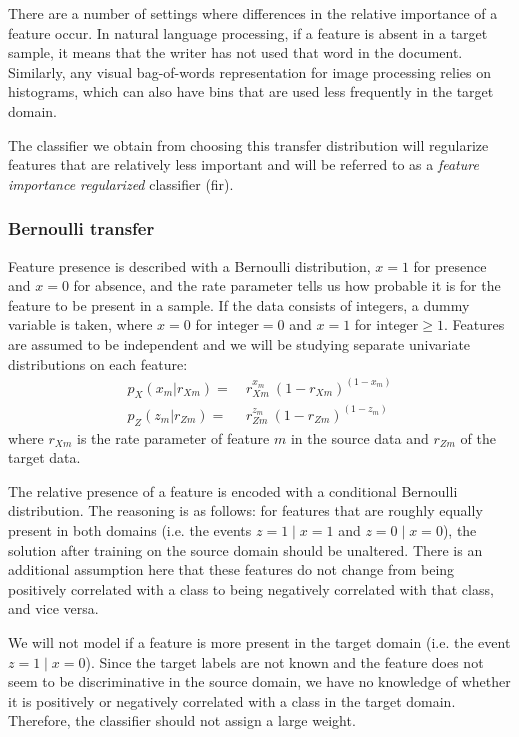 \documentclass[twoside,11pt]{article}
\begin{document}
There are a number of settings where differences in the relative importance of a feature occur. In natural language processing, if a feature is absent in a target sample, it means that the writer has not used that word in the document. Similarly, any visual bag-of-words representation for image processing relies on histograms, which can also have bins that are used less frequently in the target domain. 

The classifier we obtain from choosing this transfer distribution will regularize features that are relatively less important and will be referred to as a \emph{feature importance regularized} classifier ({\sc fir}).

\subsubsection{Bernoulli transfer}
Feature presence is described with a Bernoulli distribution, $x=1$ for presence and $x=0$ for absence, and the rate parameter tells us how probable it is for the feature to be present in a sample. If the data consists of integers, a dummy variable is taken, where $x=0$ for $\text{integer}=0$ and $x=1$ for $\text{integer}\geq 1$. Features are assumed to be independent and we will be studying separate univariate distributions on each feature:
\begin{align}
p_{X}(x_{m}|r_{Xm}) =& \ r_{Xm}^{x_m} \ (1-r_{Xm})^{(1-x_m)} \label{bernQ}\\
p_{Z}(z_{m}|r_{Zm}) =& \ r_{Zm}^{z_m} \ (1-r_{Zm})^{(1-z_m)} \label{bernP}
\end{align}
where $r_{Xm}$ is the rate parameter of feature $m$ in the source data and $r_{Zm}$ of the target data. 

The relative presence of a feature is encoded with a conditional Bernoulli distribution. The reasoning is as follows: for features that are roughly equally present in both domains (i.e. the events $z=1 \mid  x=1$ and $z=0 \mid x=0$), the solution after training on the source domain should be unaltered. There is an additional assumption here that these features do not change from being positively correlated with a class to being negatively correlated with that class, and vice versa. 

We will not model if a feature is more present in the target domain (i.e. the event $z=1 \mid x=0$). Since the target labels are not known and the feature does not seem to be discriminative in the source domain, we have no knowledge of whether it is positively or negatively correlated with a class in the target domain. Therefore, the classifier should not assign a large weight.
\end{document}
